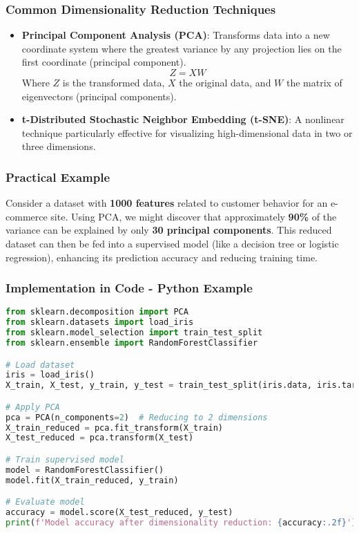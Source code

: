 \documentclass[aspectratio=169]{beamer}
\begin{document}
\begin{frame}[fragile]
    \frametitle{Common Dimensionality Reduction Techniques}
    \begin{itemize}
        \item \textbf{Principal Component Analysis (PCA)}: Transforms data into a new coordinate system where the greatest variance by any projection lies on the first coordinate (principal component).
        \begin{equation}
        Z = XW
        \end{equation}
        Where \( Z \) is the transformed data, \( X \) the original data, and \( W \) the matrix of eigenvectors (principal components).
        
        \item \textbf{t-Distributed Stochastic Neighbor Embedding (t-SNE)}: A nonlinear technique particularly effective for visualizing high-dimensional data in two or three dimensions.
    \end{itemize}
\end{frame}

\begin{frame}[fragile]
    \frametitle{Practical Example}
    Consider a dataset with \textbf{1000 features} related to customer behavior for an e-commerce site. Using PCA, we might discover that approximately \textbf{90\%} of the variance can be explained by only \textbf{30 principal components}. This reduced dataset can then be fed into a supervised model (like a decision tree or logistic regression), enhancing its prediction accuracy and reducing training time.
\end{frame}

\begin{frame}[fragile]
    \frametitle{Implementation in Code - Python Example}
    \begin{lstlisting}[language=Python]
from sklearn.decomposition import PCA
from sklearn.datasets import load_iris
from sklearn.model_selection import train_test_split
from sklearn.ensemble import RandomForestClassifier

# Load dataset
iris = load_iris()
X_train, X_test, y_train, y_test = train_test_split(iris.data, iris.target, test_size=0.2)

# Apply PCA
pca = PCA(n_components=2)  # Reducing to 2 dimensions
X_train_reduced = pca.fit_transform(X_train)
X_test_reduced = pca.transform(X_test)

# Train supervised model
model = RandomForestClassifier()
model.fit(X_train_reduced, y_train)

# Evaluate model
accuracy = model.score(X_test_reduced, y_test)
print(f'Model accuracy after dimensionality reduction: {accuracy:.2f}')
    \end{lstlisting}
\end{frame}
\end{document}
